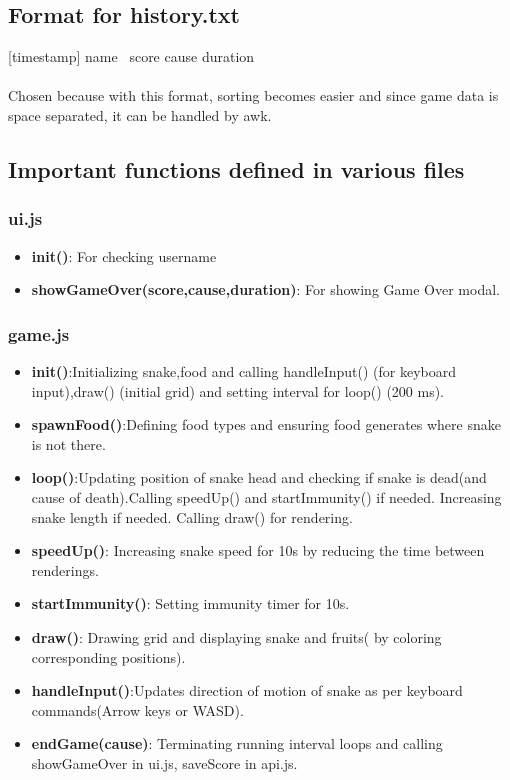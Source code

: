\documentclass[12pt]{article}
\begin{document}
\subsection{Format for history.txt}

[timestamp] name \textbar~score  cause  duration \\ \\Chosen because with this format, sorting becomes easier and since game data is space separated, it can be handled by awk.

\subsection{Important functions defined in various files}
\subsubsection{ui.js}
\begin{itemize}
\item \textbf{init()}: For checking username\\
\item \textbf{showGameOver(score,cause,duration)}: For showing Game Over modal.\\
\end{itemize}
\subsubsection{game.js}
\begin{itemize}
\item \textbf{init()}:Initializing snake,food and calling handleInput() (for keyboard input),draw() (initial grid) and setting interval for loop() (200 ms).\\
\item \textbf{spawnFood()}:Defining food types and ensuring food generates where snake is not there.\\
\item \textbf{loop()}:Updating position of snake head and checking if snake is dead(and cause of death).Calling speedUp() and startImmunity() if needed. Increasing snake length if needed. Calling draw() for rendering.\\
\item \textbf{speedUp()}: Increasing snake speed for 10s by reducing the time between renderings.\\
\item \textbf{startImmunity()}: Setting immunity timer for 10s.\\
\item \textbf{draw()}: Drawing grid and displaying snake and fruits( by coloring corresponding positions).\\
\item \textbf{handleInput()}:Updates direction of motion of snake as per keyboard commands(Arrow keys or WASD).\\
\item \textbf{endGame(cause)}: Terminating running interval loops and calling showGameOver in ui.js, saveScore in api.js.\\

\end{itemize}
\end{document}
